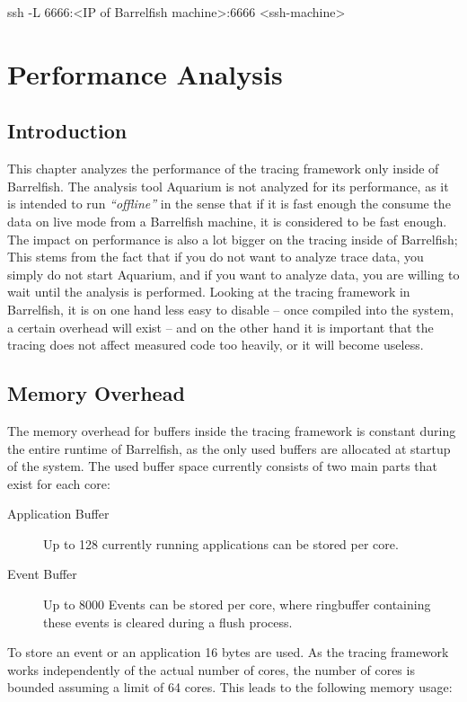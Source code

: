 \documentclass[a4paper,11pt,twoside]{report}
\begin{document}
\begin{code}
ssh -L 6666:<IP of Barrelfish machine>:6666 <ssh-machine>
\end{code}

\chapter{Performance Analysis}

\section{Introduction}

This chapter analyzes the performance of the tracing framework only inside of
Barrelfish. The analysis tool Aquarium is not analyzed for its performance, as
it is intended to run \emph{``offline''} in the sense that if it is fast enough
the consume the data on live mode from a Barrelfish machine, it is considered to
be fast enough. The impact on performance is also a lot bigger on the tracing
inside of Barrelfish; This stems from the fact that if you do not want to
analyze trace data, you simply do not start Aquarium, and if you want to analyze
data, you are willing to wait until the analysis is performed. Looking at the
tracing framework in Barrelfish, it is on one hand less easy to disable -- once
compiled into the system, a certain overhead will exist -- and on the other hand
it is important that the tracing does not affect measured code too heavily, or
it will become useless.

\section{Memory Overhead}

The memory overhead for buffers inside the tracing framework is constant during
the entire runtime of Barrelfish, as the only used buffers are allocated at
startup of the system. The used buffer space currently consists of two main
parts that exist for each core:

\begin{description}
	\item[Application Buffer] Up to 128 currently running applications can be
		stored per core.
	\item[Event Buffer] Up to 8000 Events can be stored per core, where
		ringbuffer containing these events is cleared during a flush process.
\end{description}

To store an event or an application 16 bytes are used. As the tracing framework
works independently of the actual number of cores, the number of cores is
bounded assuming a limit of 64 cores. This leads to the following memory usage:
\end{document}

